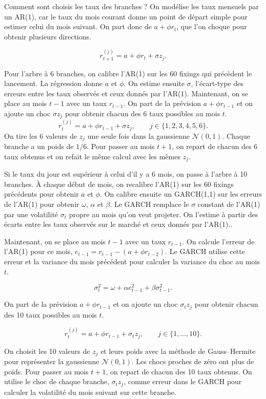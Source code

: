 \documentclass[11pt,a4paper]{article}
\begin{document}
Comment sont choisis les taux des branches ? On modélise les taux mensuels par un AR(1), car le taux du mois courant donne un point de départ simple pour estimer celui du mois suivant. On part donc de $a+\phi r_t$, que l'on choque pour obtenir plusieurs directions.

$$
r_{t+1}^{(j)}=a+\phi r_t+\sigma z_j.
$$

Pour l'arbre à 6 branches, on calibre l'AR(1) sur les 60 fixings qui précèdent le lancement. La régression donne $a$ et $\phi$. On estime ensuite $\sigma$, l'écart-type des erreurs entre les taux observés et ceux donnés par l'AR(1).
Maintenant, on se place au mois $t-1$ avec un taux $r_{t-1}$. On part de la prévision $a+\phi r_{t-1}$ et on ajoute un choc $\sigma z_j$ pour obtenir chacun des 6 taux possibles au mois $t$.
$$
r_t^{(j)}=a+\phi r_{t-1}+\sigma z_j,\qquad j\in\{1,2,3,4,5,6\}.
$$
On tire les 6 valeurs de $z_j$ une seule fois dans la gaussienne $\mathcal{N}(0,1)$. Chaque branche a un poids de $1/6$. Pour passer au mois $t+1$, on repart de chacun des 6 taux obtenus et on refait le même calcul avec les mêmes $z_j$.


Si le taux du jour est supérieur à celui d'il y a 6 mois, on passe à l'arbre à 10 branches. À chaque début de mois, on recalibre l'AR(1) sur les 60 fixings précédents pour obtenir $a$ et $\phi$. On calibre ensuite un GARCH(1,1) sur les erreurs de l'AR(1) pour obtenir $\omega$, $\alpha$ et $\beta$. Le GARCH remplace le $\sigma$ constant de l'AR(1) par une volatilité $\sigma_t$ propre au mois qu'on veut projeter. On l'estime à partir des écarts entre les taux observés sur le marché et ceux donnés par l'AR(1)..

Maintenant, on se place au mois $t-1$ avec un taux $r_{t-1}$. On calcule l'erreur de l'AR(1) pour ce mois, $e_{t-1}=r_{t-1}-(a+\phi r_{t-2})$. Le GARCH utilise cette erreur et la variance du mois précédent pour calculer la variance du choc au mois $t$.

$$
\sigma_t^2=\omega+\alpha e_{t-1}^2+\beta\sigma_{t-1}^2.
$$

On part de la prévision $a+\phi r_{t-1}$ et on ajoute un choc $\sigma_t z_j$ pour obtenir chacun des 10 taux possibles au mois $t$.

$$
r_t^{(j)}=a+\phi r_{t-1}+\sigma_t z_j,\qquad j\in\{1,\ldots,10\}.
$$

On choisit les 10 valeurs de $z_j$ et leurs poids avec la méthode de Gauss--Hermite pour représenter la gaussienne $\mathcal{N}(0,1)$. Les chocs proches de zéro ont plus de poids. Pour passer au mois $t+1$, on repart de chacun des 10 taux obtenus. On utilise le choc de chaque branche, $\sigma_t z_j$, comme erreur dans le GARCH pour calculer la volatilité du mois suivant sur cette branche.
\end{document}

